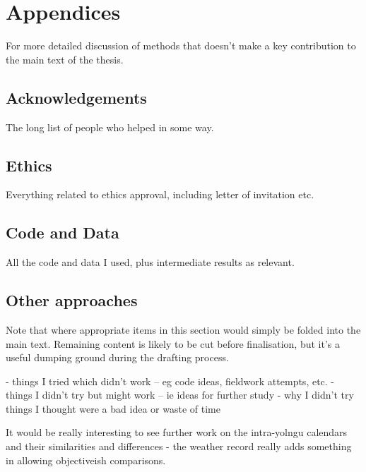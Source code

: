 \chapter{Appendices}
For more detailed discussion of methods that doesn't make a key contribution to the main text of the thesis.

\section{Acknowledgements}
The long list of people who helped in some way.

\section{Ethics} \label{sec:ethics}
Everything related to ethics approval, including letter of invitation etc.

\section{Code and Data}
All the code and data I used, plus intermediate results as relevant.

\section{Other approaches}
Note that where appropriate items in this section would simply be folded into the main text.  Remaining content is likely to be cut before finalisation, but it's a useful dumping ground during the drafting process.

-	things I tried which didn't work – eg code ideas, fieldwork attempts, etc.
-	things I didn't try but might work – ie ideas for further study
-	why I didn't try things I thought were a bad idea or waste of time

It would be really interesting to see further work on the intra-yolngu calendars and their similarities and differences - the weather record really adds something in allowing objectiveish comparisons.


